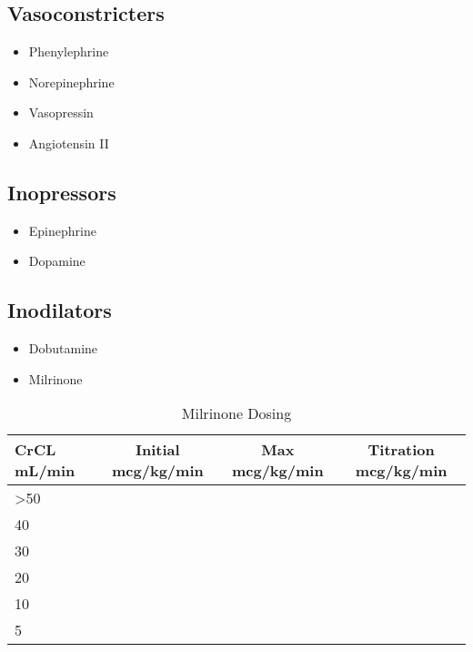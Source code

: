 \documentclass[main.tex]{subfiles}
\begin{document}
\subsection{Vasoconstricters}
\begin{itemize}[noitemsep]
	\item Phenylephrine
	\item Norepinephrine
	\item Vasopressin
	\item Angiotensin II
\end{itemize}

\subsection{Inopressors}
\begin{itemize}[noitemsep]
	\item Epinephrine
	\item Dopamine 
\end{itemize}

\subsection{Inodilators}
\begin{itemize}[noitemsep]
	\item Dobutamine
	\item Milrinone
\end{itemize}

\begin{table}[h]
	\centering
	\caption{Milrinone Dosing\autocite{lexi-drugsMilrinone} }
	\label{tab:milrinone-dosing}
	\begin{tabular}{l c c c}
		\textbf{CrCL \si{mL/min}} & \textbf{Initial \si{mcg/kg/min}} & \textbf{Max} \si{mcg/kg/min} & \textbf{Titration} \si{mcg/kg/min} \\ \hline
		\textgreater50 &  & & \\
		40 & & & \\
		30 & & & \\
		20 & & & \\
		10 & & & \\
		5 & & & \\
	\end{tabular}
\end{table}
\end{document}
